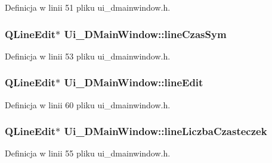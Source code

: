 Definicja w linii 51 pliku ui\+\_\+dmainwindow.\+h.

\hypertarget{class_ui___d_main_window_aad165daf4686baecb2ccd6709c629579}{}
\subsubsection[{line\+Czas\+Sym}]{\setlength{\rightskip}{0pt plus 5cm}Q\+Line\+Edit$\ast$ Ui\+\_\+\+D\+Main\+Window\+::line\+Czas\+Sym}\label{class_ui___d_main_window_aad165daf4686baecb2ccd6709c629579}


Definicja w linii 53 pliku ui\+\_\+dmainwindow.\+h.

\hypertarget{class_ui___d_main_window_a26b955a365ed5865f327921708f1a72f}{}
\subsubsection[{line\+Edit}]{\setlength{\rightskip}{0pt plus 5cm}Q\+Line\+Edit$\ast$ Ui\+\_\+\+D\+Main\+Window\+::line\+Edit}\label{class_ui___d_main_window_a26b955a365ed5865f327921708f1a72f}


Definicja w linii 60 pliku ui\+\_\+dmainwindow.\+h.

\hypertarget{class_ui___d_main_window_a49c95cda7e035087a4367514e5540298}{}
\subsubsection[{line\+Liczba\+Czasteczek}]{\setlength{\rightskip}{0pt plus 5cm}Q\+Line\+Edit$\ast$ Ui\+\_\+\+D\+Main\+Window\+::line\+Liczba\+Czasteczek}\label{class_ui___d_main_window_a49c95cda7e035087a4367514e5540298}


Definicja w linii 55 pliku ui\+\_\+dmainwindow.\+h.

\hypertarget{class_ui___d_main_window_a73bafa5343a8e3cb7cd673a24be76008}{}
